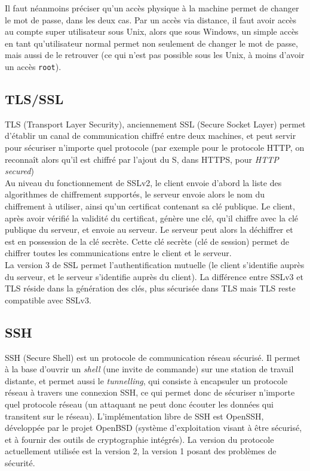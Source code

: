 Il faut néanmoins préciser qu'un accès physique à la machine
permet de changer le mot de passe, dans les deux cas. Par un accès
via distance, il faut avoir accès au compte super utilisateur sous
Unix, alors que sous Windows, un simple accès en tant
qu'utilisateur normal permet non seulement de changer le mot de
passe, mais aussi de le retrouver (ce qui n'est pas possible sous
les Unix, à moins d'avoir un accès \texttt{root}).
\subsection{TLS/SSL}
TLS (Transport Layer Security), anciennement SSL (Secure Socket
Layer) permet d'établir un canal de communication chiffré entre
deux machines, et peut servir pour sécuriser n'importe quel
protocole (par exemple pour le protocole HTTP, on reconnaît alors qu'il
est chiffré par l'ajout du S, dans HTTPS, pour \emph{HTTP
secured})
\\
 
Au niveau du fonctionnement de SSLv2, le client envoie d'abord la liste des
algorithmes de chiffrement supportés, le serveur envoie alors le
nom du chiffrement à utiliser, ainsi qu'un
certificat contenant sa clé publique. Le client, après avoir
vérifié la validité du certificat, génère une clé, qu'il
chiffre avec la clé publique du serveur, et envoie au serveur.
Le serveur peut alors la déchiffrer et est
en possession de la clé secrète.
Cette clé secrète (clé de session) permet de chiffrer toutes les
communications entre le client et le serveur.
\\

La version 3 de SSL permet l'authentification mutuelle (le client
s'identifie auprès du serveur, et le serveur s'identifie auprès du
client). La différence entre SSLv3 et TLS réside dans la
génération des clés, plus sécurisée dans TLS mais TLS reste
compatible avec SSLv3.

\subsection{SSH}
SSH (Secure Shell) est un protocole de communication réseau
sécurisé. Il permet à la base d'ouvrir un \emph{shell} (une invite
de commande) sur une station de travail distante, et permet aussi
le \emph{tunnelling}, qui consiste à encapsuler un protocole
réseau à travers une connexion SSH, ce qui permet donc de
sécuriser n'importe quel protocole réseau (un attaquant ne peut
donc écouter les données qui transitent sur le réseau).
L'implémentation libre de SSH est OpenSSH, développée par le
projet OpenBSD (système d'exploitation visant à être sécurisé, et
à fournir des outils de cryptographie intégrés). La version 
du protocole
actuellement utilisée est la version 2, la version 1 posant des
problèmes de sécurité.
\\

